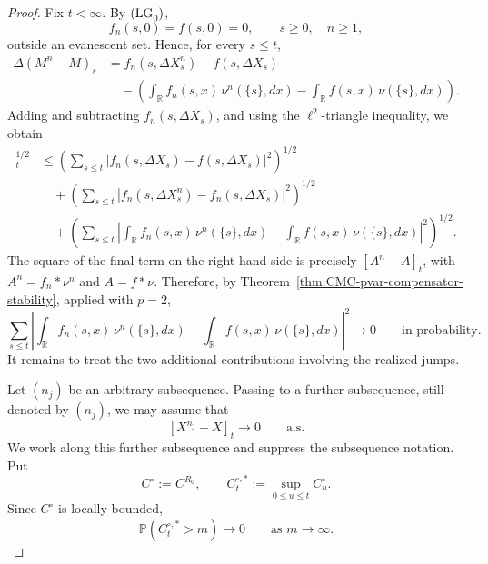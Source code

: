\documentclass[a4paper,10pt]{article}
\begin{document}
\begin{proof}
Fix \(t<\infty\). By \({\rm (LG}_0{\rm )}\),
\[
        f_n(s,0)=f(s,0)=0,
        \qquad s\ge0,\quad n\ge1,
\]
outside an evanescent set. Hence, for every \(s\le t\),
\[
\begin{aligned}
\Delta(M^n-M)_s
&=
f_n(s,\Delta X^n_s)-f(s,\Delta X_s)
\\
&\quad-
\left(
\int_{\mathbb R}f_n(s,x)\,\nu^n(\{s\},dx)
-
\int_{\mathbb R}f(s,x)\,\nu(\{s\},dx)
\right).
\end{aligned}
\]
Adding and subtracting \(f_n(s,\Delta X_s)\), and using the
\(\ell^2\)-triangle inequality, we obtain
\begin{align}
[M^n-M]_t^{1/2}
&\le
\left(
\sum_{s\le t}
\left|
f_n(s,\Delta X_s)-f(s,\Delta X_s)
\right|^2
\right)^{1/2}
\nonumber\\
&\quad+
\left(
\sum_{s\le t}
\left|
f_n(s,\Delta X^n_s)-f_n(s,\Delta X_s)
\right|^2
\right)^{1/2}
\nonumber\\
&\quad+
\left(
\sum_{s\le t}
\left|
\int_{\mathbb R}f_n(s,x)\,\nu^n(\{s\},dx)
-
\int_{\mathbb R}f(s,x)\,\nu(\{s\},dx)
\right|^2
\right)^{1/2}.
\label{eq:compensated-three-term-decomposition}
\end{align}
The square of the final term on the right-hand side is precisely
\([A^n-A]_t\), with \(A^n=f_n*\nu^n\) and \(A=f*\nu\). Therefore,
by Theorem~\ref{thm:CMC-pvar-compensator-stability}, applied with
\(p=2\),
\begin{equation}
\sum_{s\le t}
\left|
\int_{\mathbb R}f_n(s,x)\,\nu^n(\{s\},dx)
-
\int_{\mathbb R}f(s,x)\,\nu(\{s\},dx)
\right|^2
\longrightarrow0
\qquad\text{in probability}.
\label{eq:compensated-compensator-contribution}
\end{equation}
It remains to treat the two additional contributions involving the
realized jumps.

Let \((n_j)\) be an arbitrary subsequence. Passing to a further
subsequence, still denoted by \((n_j)\), we may assume that
\[
        [X^{n_j}-X]_t\longrightarrow0
        \qquad\text{a.s.}
\]
We work along this further subsequence and suppress the subsequence
notation. Put
\[
        C^\circ:=C^{R_0},
        \qquad
        C_t^{\circ,*}:=\sup_{0\le u\le t}C^\circ_u.
\]
Since \(C^\circ\) is locally bounded,
\[
        \mathbb P(C_t^{\circ,*}>m)\longrightarrow0
        \qquad\text{as }m\to\infty.
\]


\end{proof}
\end{document}
